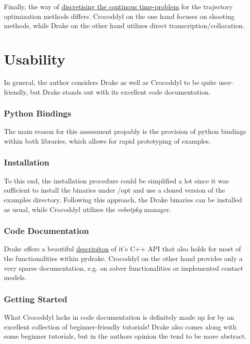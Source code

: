 Finally, the way of \href{http://underactuated.csail.mit.edu/trajopt.html#section2}{discretising the continous time-problem} for the trajectory optimization methods differs. Crocoddyl on the one hand focuses on shooting methods, while Drake on the other hand utilizes direct transcription/collocation.


\section{Usability}
In general, the author considers Drake as well as Crocoddyl to be quite user-friendly, but Drake stands out with its excellent code documentation.

\subsubsection{Python Bindings}
The main reason for this assessment propably is the provision of python bindings within both libraries, which allows for rapid prototyping of examples. 

\subsubsection{Installation}
To this end, the installation procedure could be simplified a lot since it was sufficient to install the binaries under /opt and use a cloned version of the examples directory. Following this approach, the Drake binaries can be installed as usual, while Crocoddyl utilizes the \textit{robotpkg} manager.

\subsubsection{Code Documentation}
Drake offers a beautiful \href{https://drake.mit.edu/doxygen_cxx/index.html}{descripiton} of it's C++ API that also holds for most of the functionalities within pydrake. Crocoddyl on the other hand provides only a very sparse documentation, e.g. on solver functionalities or implemented contact models. 

\subsubsection{Getting Started}
What Crocoddyl lacks in code documentation is definitely made up for by an excellent collection of beginner-friendly tutorials! Drake also comes along with some beginner tutorials, but in the authors opinion the tend to be more abstract.

